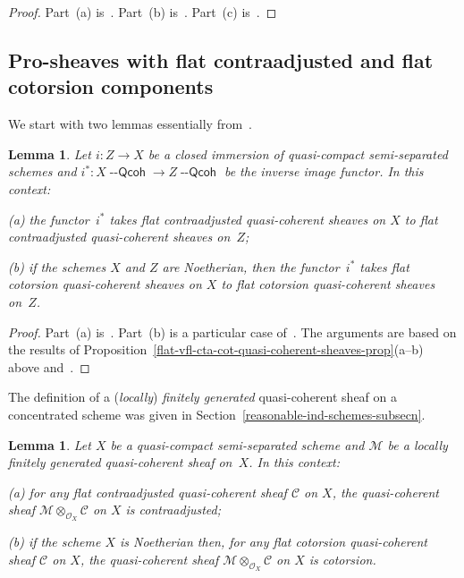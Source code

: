 \documentclass[12pt,a4paper]{amsart}
\newcommand{\+}{\protect\nobreakdash-}
\renewcommand{\:}{\colon}
\newcommand{\rarrow}{\longrightarrow}
\newcommand{\ot}{\otimes}
\newcommand{\Qcoh}{{\operatorname{\mathsf{--Qcoh}}}}
\newcommand{\cO}{\mathcal O}
\newcommand{\cM}{\mathcal M}
\newcommand{\cC}{\mathcal C}
\theoremstyle{plain}
\newtheorem{lem}[thm]{Lemma}
\theoremstyle{definition}
\begin{document}
\begin{proof}
 Part~(a) is~\cite[Lemma~4.1.12]{Pcosh}.
 Part~(b) is~\cite[Lemma~4.1.6]{Pcosh}.
 Part~(c) is~\cite[Lemma~4.1.5]{Pcosh}.
\end{proof}

\subsection{Pro-sheaves with flat contraadjusted and flat cotorsion
components}
 We start with two lemmas essentially from~\cite[Section~8.5]{Pform}.

\begin{lem} \label{closed-subscheme-flat-cta-cot-lemma}
 Let $i\:Z\rarrow X$ be a closed immersion of quasi-compact
semi-separated schemes and $i^*\:X\Qcoh\rarrow Z\Qcoh$
be the inverse image functor.  In this context: \par
\textup{(a)} the functor~$i^*$ takes flat contraadjusted quasi-coherent
sheaves on $X$ to flat contraadjusted quasi-coherent sheaves on~$Z$;
\par
\textup{(b)} if the schemes $X$ and $Z$ are Noetherian, then
the functor~$i^*$ takes flat cotorsion quasi-coherent sheaves on $X$
to flat cotorsion quasi-coherent sheaves on~$Z$.
\end{lem}

\begin{proof}
 Part~(a) is~\cite[Corollary~8.5.4(a)]{Pform}.
 Part~(b) is a particular case of~\cite[Corollary~8.5.4(b)]{Pform}.
 The arguments are based on the results of
Proposition~\ref{flat-vfl-cta-cot-quasi-coherent-sheaves-prop}(a\+-b)
above and~\cite[Lemmas~1.7.7(b) and~1.7.9(a)]{Pcosh}.
\end{proof}

 The definition of a (\emph{locally}) \emph{finitely generated}
quasi-coherent sheaf on a concentrated scheme was given
in Section~\ref{reasonable-ind-schemes-subsecn}.

\begin{lem} \label{tensor-product-flat-cta-cot-lemma}
 Let $X$ be a quasi-compact semi-separated scheme and\/ $\cM$ be
a locally finitely generated quasi-coherent sheaf on~$X$.
 In this context: \par
\textup{(a)} for any flat contraadjusted quasi-coherent sheaf\/ $\cC$
on $X$, the quasi-coherent sheaf\/ $\cM\ot_{\cO_X}\cC$ on $X$ is
contraadjusted; \par
\textup{(b)} if the scheme $X$ is Noetherian then, for any flat
cotorsion quasi-coherent sheaf\/ $\cC$ on $X$, the quasi-coherent
sheaf\/ $\cM\ot_{\cO_X}\cC$ on $X$ is cotorsion.
\end{lem}
\end{document}
